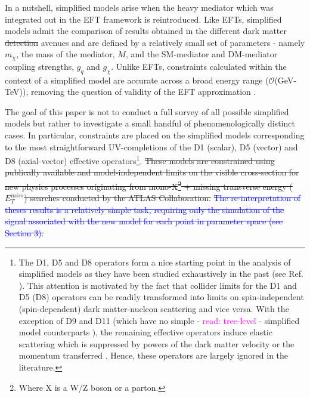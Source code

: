 \begin{flushleft}
\hspace{1cm}In a nutshell, simplified models arise when the heavy mediator which was integrated out in the EFT framework is reintroduced. Like EFTs, simplified models admit the comparison of results obtained in the different dark matter \st{detection}  avenues \cite{} and are defined by a relatively small set of parameters - namely $m_\chi$, the mass of the mediator, $M$, and the SM-mediator and DM-mediator coupling strengths, $g_{q}$ and $g_\chi$. Unlike EFTs, constraints calculated within the context of a simplified model are accurate across a broad energy range ($\mathcal{O}$(GeV-TeV)), removing the question of validity of the EFT approximation \cite{}. 

\hspace{1cm}The goal of this paper is not to conduct a full survey of all possible simplified models but rather to investigate a small handful of phenomenologically distinct cases. In particular, constraints are placed on the simplified models corresponding to the most straightforward UV-completions of the D1 (scalar), D5 (vector) and D8 (axial-vector) effective operators\footnote{The D1, D5 and D8 operators form a nice starting point in the analysis of simplified models as they have been studied exhaustively in the past (see Ref. \cite{}).  This attention is motivated by the fact that collider limits for the D1 and D5 (D8) operators can be readily transformed into limits on spin-independent (spin-dependent) dark matter-nucleon scattering and vice versa. With the exception of D9 and D11 (which have no simple - \textcolor{magenta}{read: tree-level} - simplified model counterparts \cite{}), the remaining effective operators induce elastic scattering which is suppressed by powers of the dark matter velocity or the momentum transferred \cite{Kumar}. Hence, these operators are largely ignored in the literature. }. %
\st{These models are constrained using publically available and model-independent limits on the visible cross-section for new physics processes originating from mono-X\footnote{Where X is a W/Z boson or a parton.} + missing transverse energy ($E_{T}^{miss}$) searches conducted by the ATLAS Collaboration.}  \textcolor{blue}{\st{The re-interpretation of theses results is a relatively simple task, requiring only the simulation of the signal associated with the new model for each point in parameter space (see Section 3).}} 


\end{flushleft}

